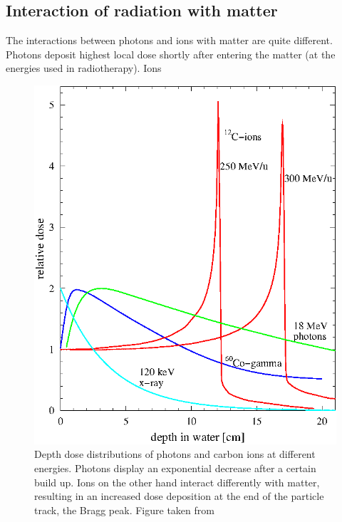 \documentclass[type=dr, dr=rernat, accentcolor=tud7b,colorbacktitle, bigchapter, openright, twoside, 12pt ]{tudthesis}
\begin{document}
\subsection{Interaction of radiation with matter}

The interactions between photons and ions with matter are quite different. Photons deposit highest local dose shortly after entering the matter (at the energies used in radiotherapy).
Ions 

\newpage
 
\vspace*{1cm}
 
\begin{figure}[H]
\begin{center}
\includegraphics[scale=1]{depthdose.png}
\caption{Depth dose distributions of photons and carbon ions at different energies. Photons display an exponential decrease after a certain 
build up. Ions on the other hand interact differently with matter, resulting in an increased dose deposition at the end of the particle 
track, the Bragg peak. Figure taken from \cite{Schardt2010} }
\label{ddp}
\end{center}
\end{figure}
% 


% 
\end{document}
